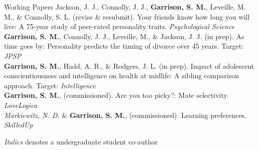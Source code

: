 \documentclass {resume}
\newcommand{\meb}{{\bf Garrison, S. M.}\xspace}
\begin{document}
\begin{rSection}{\textrm{Working Papers}}%
Jackson, J. J., Connolly, J. J., \meb, Leveille, M. M., \& Connolly, S. L. (revise \& resubmit). Your \hspace* {6 mm}friends know how long you will live: A 75-year study of peer-rated personality traits. \textit{Psychological Science}\smallskip\\
\meb, Connolly, J. J., Leveille, M., \& Jackson, J. J. (in prep). As time goes by: Personality predicts the \hspace* {6 mm}timing of divorce over 45 years. Target: \textit{JPSP}\smallskip\\
\meb, Hadd, A. R., \& Rodgers, J. L. (in prep). Impact of adolescent conscientiousness and intelligence \hspace* {6 mm}on health at midlife: A sibling comparison approach. Target: \textit{Intelligence}\smallskip\\
\meb, (commissioned). Are you too picky?: Mate selectivity. \textit{LoveLogica}\smallskip\\
\textit{Markiewitz, N. D.} \& \meb, (commissioned). Learning preferences. \textit{SkilledUp}\vspace{-2mm}\begin{center}\footnotesize{\textit{Italics} denotes a undergraduate student co-author}\end{center} \vspace{-4mm}
\end{rSection}%
\end{document}
